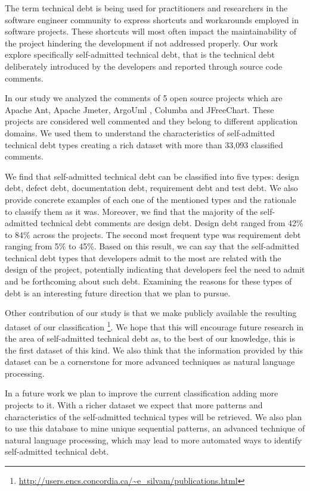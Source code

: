 The term technical debt is being used for practitioners and researchers in the software engineer community to express shortcuts and workarounds employed in software projects. These shortcuts will most often impact the maintainability of the project hindering the development if not addressed properly. Our work explore specifically self-admitted technical debt, that is the technical debt deliberately introduced by the developers and reported through source code comments.

In our study we analyzed the comments of 5 open source projects which are Apache Ant, Apache Jmeter, ArgoUml , Columba and JFreeChart. These projects are considered well commented and they belong to different application domains. We used them to understand the characteristics of self-admitted technical debt types creating a rich dataset with more than 33,093 classified comments.


We find that self-admitted technical debt can be classified into five types: design debt, defect debt, documentation debt, requirement debt and test debt. We also provide concrete examples of each one of the mentioned types and the rationale to classify them as it was. Moreover, we find that the majority of the self-admitted technical debt comments are design debt. Design debt ranged from 42\% to 84\% across the projects. The second most frequent type was requirement debt ranging from 5\% to 45\%. Based on this result, we can say that the self-admitted technical debt types that developers admit to the most are related with the design of the project, potentially indicating that developers feel the need to admit and be forthcoming about such debt. Examining the reasons for these types of debt is an interesting future direction that we plan to pursue.

Other contribution of our study is that we make publicly available the resulting dataset of our classification \footnote{ \url{http://users.encs.concordia.ca/~e_silvam/publications.html}}. We hope that this will encourage future research in the area of self-admitted technical debt as, to the best of our knowledge, this is the first dataset of this kind. We also think that the information provided by this dataset can be a cornerstone for more advanced techniques as natural language processing.   

In a future work we plan to improve the current classification adding more projects to it. With a richer dataset we expect that more patterns and characteristics of the self-admitted technical types will be retrieved. We also plan to use this database to mine unique sequential patterns, an advanced technique of natural language processing, which may lead to more automated ways to identify self-admitted technical debt. 
